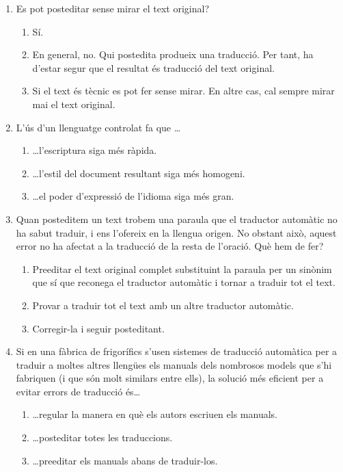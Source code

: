 \begin{enumerate}
\item Es pot posteditar sense mirar el text original?
  \begin{enumerate}
  \item Sí.
  \item En general, no. Qui postedita produeix una traducció. Per
    tant, ha d'estar segur que el resultat és traducció del text
    original.
  \item Si el text és tècnic es pot fer sense mirar. En altre cas, cal
    sempre mirar mai el text original.
  \end{enumerate}

\item L'ús d'un llenguatge controlat fa que \ldots
  \begin{enumerate}
  \item \ldots l'escriptura siga més ràpida.
  \item \ldots l'estil del document resultant siga més homogeni.
  \item \ldots el poder d'expressió de l'idioma siga més gran.
  \end{enumerate}

\item Quan posteditem un text trobem una paraula que el traductor
  automàtic no ha sabut traduir, i ens l'ofereix en la llengua
  origen. No obstant això, aquest error no ha afectat a la traducció
  de la resta de l'oració. Què hem de fer?
  \begin{enumerate}
  \item Preeditar el text original complet substituint la paraula per
    un sinònim que sí que reconega el traductor automàtic i tornar a
    traduir tot el text.
  \item Provar a traduir tot el text amb un altre traductor automàtic.
  \item Corregir-la i seguir posteditant.
  \end{enumerate}

\item Si en una fàbrica de frigorífics s'usen sistemes de traducció
  automàtica per a traduir a moltes altres llengües els manuals dels
  nombrosos models que s'hi fabriquen (i que són molt similars entre
  ells), la solució més eficient per a evitar errors de traducció
  és{\ldots}
  \begin{enumerate}
  \item \ldots regular la manera en què els autors escriuen els
    manuals.
  \item \ldots posteditar totes les traduccions.
  \item \ldots preeditar els manuals abans de traduir-los.
  \end{enumerate}

\end{enumerate}

